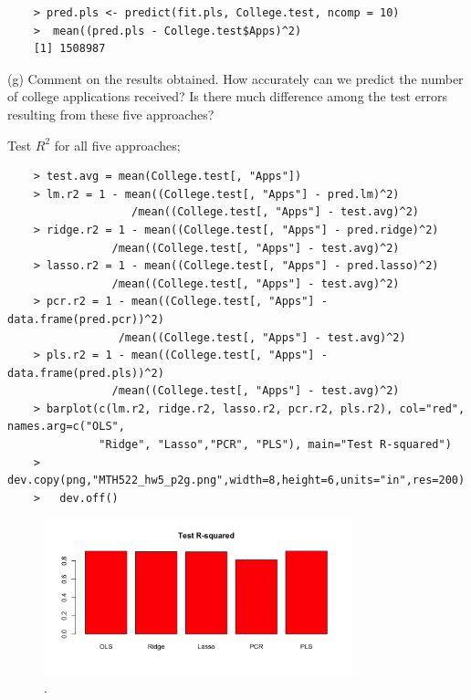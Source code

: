 \documentclass{article}
\begin{document}
\begin{program}
	\begin{verbatim}
	> pred.pls <- predict(fit.pls, College.test, ncomp = 10)
	>  mean((pred.pls - College.test$Apps)^2)	
	[1] 1508987
	\end{verbatim}
\end{program}


\newpage

(g) Comment on the results obtained. How accurately can we predict the number of college applications received? Is there much difference among the test errors resulting from these five approaches?

Test $R^2$ for all five approaches;
\begin{program}
	\begin{verbatim}
	> test.avg = mean(College.test[, "Apps"])
	> lm.r2 = 1 - mean((College.test[, "Apps"] - pred.lm)^2)
	               /mean((College.test[, "Apps"] - test.avg)^2)
	> ridge.r2 = 1 - mean((College.test[, "Apps"] - pred.ridge)^2)
	            /mean((College.test[, "Apps"] - test.avg)^2)
	> lasso.r2 = 1 - mean((College.test[, "Apps"] - pred.lasso)^2)
	            /mean((College.test[, "Apps"] - test.avg)^2)
	> pcr.r2 = 1 - mean((College.test[, "Apps"] - data.frame(pred.pcr))^2) 
	             /mean((College.test[, "Apps"] - test.avg)^2)
	> pls.r2 = 1 - mean((College.test[, "Apps"] - data.frame(pred.pls))^2)
	            /mean((College.test[, "Apps"] - test.avg)^2)
	> barplot(c(lm.r2, ridge.r2, lasso.r2, pcr.r2, pls.r2), col="red", names.arg=c("OLS", 
	          "Ridge", "Lasso","PCR", "PLS"), main="Test R-squared")
	> dev.copy(png,"MTH522_hw5_p2g.png",width=8,height=6,units="in",res=200)
	>  	dev.off()
	\end{verbatim}
\end{program}


\begin{figure}[htb]
	\begin{center}
		\includegraphics[width=0.8\textwidth]{MTH522_hw5_p2g.png}
	\end{center}
	\caption{.}
	\label{fig:MTH522_hw5_p2g}
\end{figure}
\end{document}
